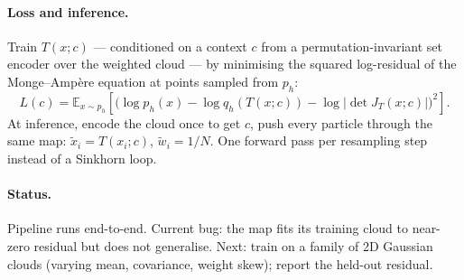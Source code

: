 \documentclass{article}
\begin{document}
\paragraph{Loss and inference.}
Train $T(x;c)$ --- conditioned on a context $c$ from a permutation-invariant set encoder over the weighted cloud --- by minimising the squared log-residual of the Monge--Amp\`ere equation at points sampled from $p_h$:
\begin{equation}
L(c) = \mathbb{E}_{x \sim p_h}\!\left[\bigl(\log p_h(x) - \log q_h(T(x;c)) - \log\left|\det J_T(x;c)\right|\bigr)^2\right].
\end{equation}
At inference, encode the cloud once to get $c$, push every particle through the same map: $\tilde x_i = T(x_i; c)$, $\tilde w_i = 1/N$. One forward pass per resampling step instead of a Sinkhorn loop.

\paragraph{Status.}
Pipeline runs end-to-end. Current bug: the map fits its training cloud to near-zero residual but does not generalise. Next: train on a family of 2D Gaussian clouds (varying mean, covariance, weight skew); report the held-out residual.
\end{document}
